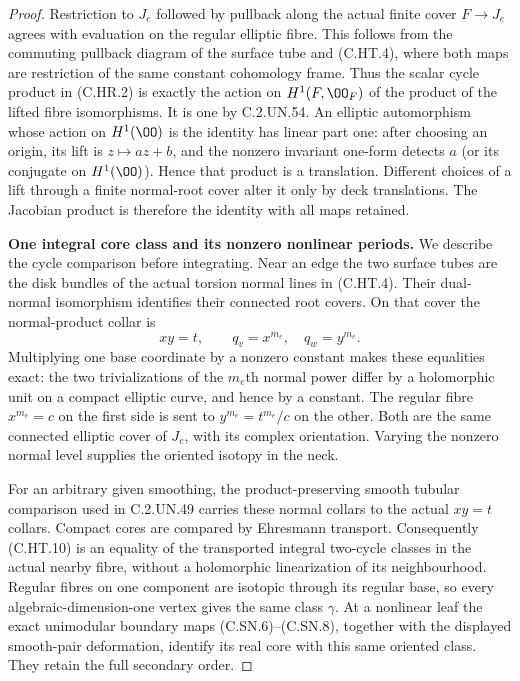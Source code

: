 \begin{proof}
Restriction to $J_e$ followed by pullback along the actual finite
cover $F\to J_e$ agrees with evaluation on the regular elliptic
fibre. This follows from the commuting pullback diagram of the
surface tube and (C.HT.4), where both maps are restriction of the
same constant cohomology frame. Thus the scalar cycle product
in (C.HR.2) is exactly the action on $H^1(F,\OO_F)$ of the product
of the lifted fibre isomorphisms. It is one by C.2.UN.54.
An elliptic automorphism whose action on $H^1(\OO)$ is the identity
has linear part one: after choosing an origin, its lift is
$z\mapsto az+b$, and the nonzero invariant one-form detects $a$
(or its conjugate on $H^1(\OO)$). Hence that product is a
translation. Different choices of a lift through a finite
normal-root cover alter it only by deck translations. The
Jacobian product is therefore the identity with all maps retained.

\par\medskip\noindent\textbf{One integral core class and its nonzero nonlinear periods.}
We describe the cycle comparison before integrating. Near an
edge the two surface tubes are the disk bundles of the actual
torsion normal lines in (C.HT.4). Their dual-normal isomorphism
identifies their connected root covers. On that cover the
normal-product collar is
\[
                  xy=t,\qquad q_v=x^{m_e},\quad
                  q_w=y^{m_e}.                         \tag{C.HT.10}
\]
Multiplying one base coordinate by a nonzero constant makes these
equalities exact: the two trivializations of the $m_e$th normal
power differ by a holomorphic unit on a compact elliptic curve,
and hence by a constant. The regular fibre $x^{m_e}=c$ on the
first side is sent to $y^{m_e}=t^{m_e}/c$ on the other. Both are
the same connected elliptic cover of $J_e$, with its complex
orientation. Varying the nonzero normal level supplies the
oriented isotopy in the neck.

For an arbitrary given smoothing, the product-preserving smooth
tubular comparison used in C.2.UN.49 carries these normal collars
to the actual $xy=t$ collars. Compact cores are compared by
Ehresmann transport. Consequently (C.HT.10) is an equality of
the transported integral two-cycle classes in the actual nearby
fibre, without a holomorphic linearization of its neighbourhood.
Regular fibres on one component are isotopic through its regular
base, so every algebraic-dimension-one vertex gives the same
class $\gamma$. At a nonlinear leaf the exact unimodular
boundary maps (C.SN.6)--(C.SN.8), together with the displayed
smooth-pair deformation, identify its real core with this same
oriented class. They retain the full secondary order.


\end{proof}
